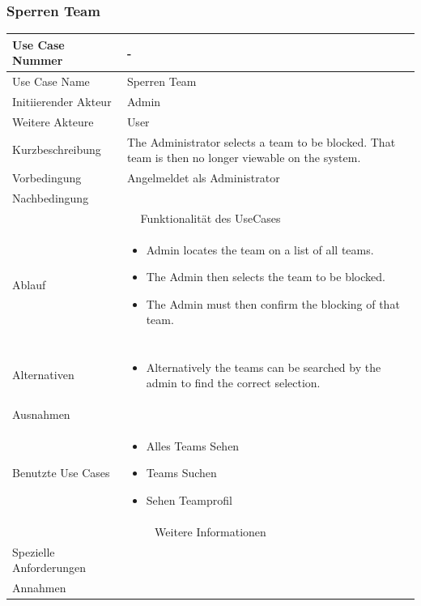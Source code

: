 \documentclass[10pt,a4paper]{article}
\begin{document}
	\subsubsection{Sperren Team}
	\begin{tabular}{|l|p{.5\linewidth}|}
	\hline Use Case Nummer & - \\ 
	\hline Use Case Name & Sperren Team \\ 
	\hline Initiierender Akteur & Admin \\
	\hline Weitere Akteure & User\\
	\hline Kurzbeschreibung & The Administrator selects a team to be blocked. That team is then no longer viewable on the system. \\
	\hline Vorbedingung & Angelmeldet als Administrator \\
	\hline Nachbedingung &  \\
	\hline \multicolumn{2}{|c|}{Funktionalität des UseCases}\\
	\hline Ablauf & \begin{itemize}
			\item Admin locates the team on a list of all teams.
			\item The Admin then selects the team to be blocked.
			\item The Admin must then confirm the blocking of that team.
		\end{itemize} \\ \\
	\hline Alternativen & \begin{itemize}
			\item Alternatively the teams can be searched by the admin to find the correct selection.
		\end{itemize} \\
	\hline Ausnahmen &  \\
	\hline Benutzte Use Cases & \begin{itemize}
			\item Alles Teams Sehen
			\item Teams Suchen
			\item Sehen Teamprofil
		\end{itemize} \\
	\hline \multicolumn{2}{|c|}{Weitere Informationen} \\
	\hline Spezielle Anforderungen &  \\
	\hline Annahmen &  \\
	\hline
	\end{tabular}
	
\end{document}
